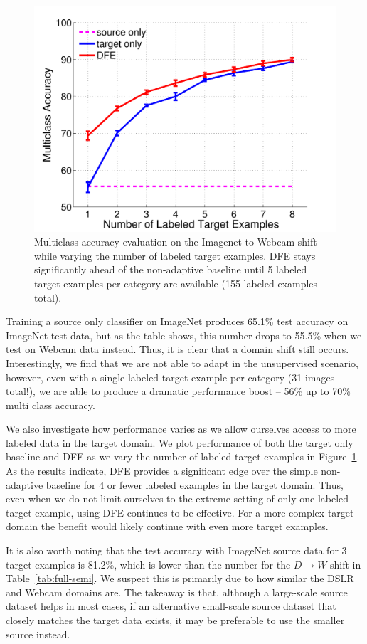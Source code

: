 \begin{figure}[h]
  \begin{center}
  \includegraphics[width=.48\textwidth]{figs/imagenet_webcam_vary_num_target_examples}
  \end{center}
  \caption{Multiclass accuracy evaluation on the Imagenet to Webcam shift while varying the number of labeled target examples. DFE stays significantly ahead of the non-adaptive baseline until 5 labeled target examples per category are available (155 labeled examples total).}
  \label{fig:vary_num_target}
\end{figure}

Training a source only classifier on ImageNet produces 65.1\% test accuracy on ImageNet test data, but as the table shows, this number drops to 55.5\% when we test on Webcam data instead. Thus, it is clear that a domain shift still occurs.
Interestingly, we find that we are not able to adapt in the unsupervised scenario, however, even with a single labeled target example per category (31 images total!), we are able to produce a dramatic performance boost -- 56\% up to 70\% multi class accuracy.

We also investigate how performance varies as we allow ourselves access to more labeled data in the target domain. We plot performance of both the target only baseline and DFE as we vary the number of labeled target examples in Figure~\ref{fig:vary_num_target}.
As the results indicate, DFE provides a significant edge over the simple non-adaptive baseline for 4 or fewer labeled examples in the target domain. Thus, even when we do not limit ourselves to the extreme setting of only one labeled target example, using DFE continues to be effective. For a more complex target domain the benefit would likely continue with even more target examples.

It is also worth noting that the test accuracy with ImageNet source data for 3 target examples is 81.2\%, which is lower than the number for the $D \rightarrow W$ shift in Table~\ref{tab:full-semi}.
We suspect this is primarily due to how similar the DSLR and Webcam domains are.
The takeaway is that, although a large-scale source dataset helps in most cases, if an alternative small-scale source dataset that closely matches the target data exists, it may be preferable to use the smaller source instead.

